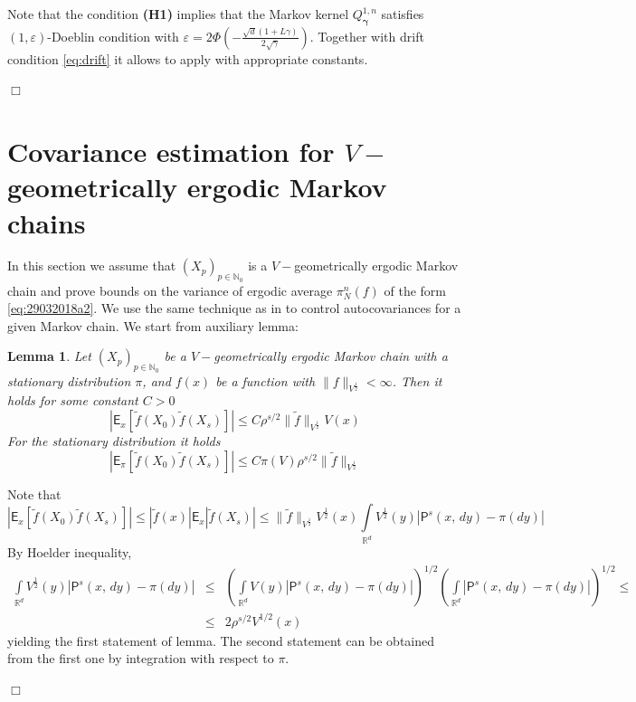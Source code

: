 \documentclass[bj]{imsart}
\def\nset{\mathbb{N}}
\def\rset{\mathbb{R}}
\def\rset{\mathbb{R}}
\newcommand{\proofendsign}{$\Box$}
\newtheorem{lem}[thm]{Lemma}
\newenvironment{proof}{{\noindent \bf Proof }}
 {{\hspace*{\fill}\proofendsign\par\bigskip}}
\begin{document}
\begin{proof} Note that the condition {\bf (H1)} implies that the Markov kernel $Q^{1,n}_{\boldsymbol{\gamma}}$ satisfies $(1,\varepsilon)$-Doeblin condition with $\varepsilon = 2\Phi\left(-\frac{\sqrt{d}(1+L\gamma)}{2\sqrt{\gamma}}\right)$. Together with drift condition \ref{eq:drift} it allows to apply \cite[Theorem~19.4.1]{moulines2018} with appropriate constants.
\end{proof}

\section{Covariance estimation for $V-$geometrically ergodic Markov chains}\label{sec:appendix_moments}
In this section we assume that $(X_p)_{p \in \nset_0}$ is a $V-$geometrically ergodic Markov chain and prove bounds on the variance of ergodic average $\pi_N^n(f)$ of the form \eqref{eq:29032018a2}. We use the same technique as in \cite{belomestny2019esvm} to control autocovariances for a given Markov chain. We start from auxiliary lemma:
\begin{lem} 
\label{lem:fp_covariance}
Let $(X_p)_{p \in \nset_0}$ be a $V-$geometrically ergodic Markov chain with a stationary distribution $\pi$, and $f(x)$ be a function with $\|f\|_{V^{\frac{1}{2}}} < \infty$. Then it holds for some constant $C > 0$
\begin{equation}
|\mathsf{E}_x[\tilde{f}(X_0)\tilde{f}(X_s)]| \leq C\rho^{s/2}\|\tilde{f}\|_{V^{\frac{1}{2}}}V(x)
\end{equation}
For the stationary distribution it holds
\begin{equation}
|\mathsf{E}_{\pi}[\tilde{f}(X_0)\tilde{f}(X_s)]| \leq C\pi(V)\rho^{s/2}\|\tilde{f}\|_{V^{\frac{1}{2}}}
\end{equation}
\end{lem}
\begin{proof}
Note that
\[
|\mathsf{E}_x[\tilde{f}(X_0)\tilde{f}(X_s)]| \leq |\tilde{f}(x)| \mathsf{E}_x|\tilde{f}(X_s)| \leq \|\tilde{f}\|_{V^{\frac{1}{2}}}V^{\frac{1}{2}}(x)\int\limits_{\rset^d} V^{\frac{1}{2}}(y)|\mathsf{P}^{s}(x,\,dy)-\pi(dy)|
\]
By Hoelder inequality, 
\begin{eqnarray*}
\int\limits_{\rset^d} V^{\frac{1}{2}}(y)|\mathsf{P}^{s}(x,\,dy)-\pi(dy)| & \leq & \left(\int\limits_{\rset^d} V(y)|\mathsf{P}^{s}(x,\,dy)-\pi(dy)|\right)^{1/2}\left(\int\limits_{\rset^d}|\mathsf{P}^{s}(x,\,dy)-\pi(dy)|\right)^{1/2} \leq \\
& \leq & 2\rho^{s/2}V^{1/2}(x)
\end{eqnarray*}
yielding the first statement of lemma. The second statement can be obtained from the first one by integration with respect to $\pi$. 
\end{proof}
 
\end{document}
